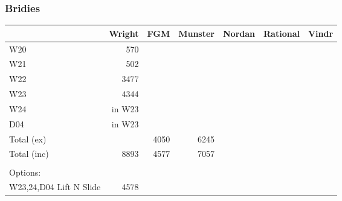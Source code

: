 \subsubsection{Bridies}
\begin{tabular}{|p{4cm}||r|r|r|r|r|r|}
\hline
&Wright & FGM  &Munster &Nordan & Rational & Vindr
\\ \hline
W20 &570          
\\ \hline
W21 &502          
\\ \hline
W22 &3477          
\\ \hline
W23 &4344          
\\ \hline
W24 & in W23        
\\ \hline
D04 & in W23          
\\ \hline
Total (ex) & &4050 &6245      
\\ \hline
Total (inc)  & 8893 & 4577 & 7057   
\\ \hline
\\ \hline
Options: 
\\ \hline
W23,24,D04 Lift N Slide  & 4578
\\ \hline
\end{tabular}
